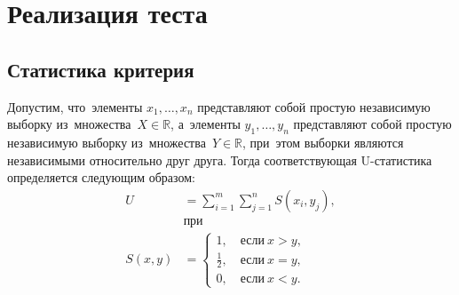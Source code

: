 \documentclass[]{scrreprt}
\begin{document}
\section{Реализация теста}
\subsection{Статистика критерия}
Допустим, что~элементы ${\textstyle x_{1},\ldots,x_{n}}$ представляют собой простую независимую выборку из~множества~${\textstyle X \in \mathbb{R}}$, а~элементы ${\textstyle y_{1},\ldots,y_{n}}$ представляют собой простую независимую выборку из~множества~${\textstyle Y \in \mathbb{R}}$, при~этом выборки являются независимыми относительно друг друга. Тогда соответствующая U-статистика определяется следующим образом:
\begin{equation}\label{eq:U-statistic-base-formula}
	\begin{aligned}
	U&=\sum_{i=1}^{m} \sum_{j=1}^{n} S (x_{i},y_{j}),\\
	&\text{при}\\
	S(x,y)&=
	\begin{cases}
	1,\quad \text{если}\ x>y,\\
	\frac{1}{2},\quad \text{если}\ x=y,\\
	0,\quad \text{если}\ x<y.
	\end{cases}
	\end{aligned}
\end{equation}
\end{document}
